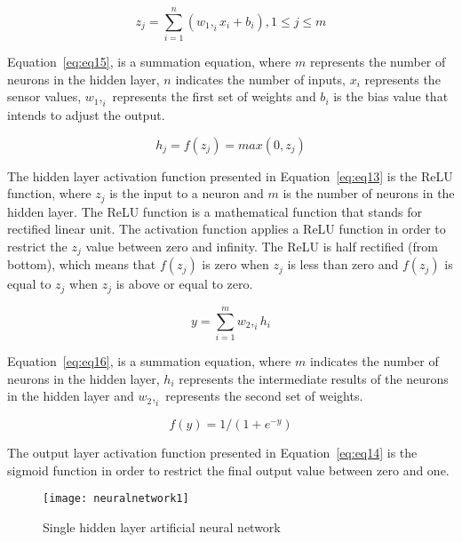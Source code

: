 \documentclass[runningheads]{llncs}
\begin{document}
\begin{equation}
\label{eq:eq15}
z_j = \sum_{i=1}^{n} (w_1,_ix_i + b_i),  1 \leq j \leq m
\end{equation}

Equation~\ref{eq:eq15}, is a summation equation, where $m$ represents the number of neurons in the hidden layer, $n$ indicates the number of inputs, $x_i$ represents the sensor values, $w_1,_i$ represents the first set of weights and $b_i$ is the bias value that intends to adjust the output.

\begin{equation}
\label{eq:eq13}
h_j = f(z_j) = max(0, z_j)
\end{equation}

The hidden layer activation function presented in Equation~\ref{eq:eq13} is the ReLU function, where $z_j$ is the input to a neuron and $m$ is the number of neurons in the hidden layer. The ReLU function is a mathematical function that stands for rectified linear unit. The activation function applies a ReLU function in order to restrict the $z_j$ value between zero and infinity. The ReLU is half rectified (from bottom), which means that $f(z_j)$ is zero when $z_j$ is less than zero and $f(z_j)$ is equal to $z_j$ when $z_j$ is above or equal to zero.

\begin{equation}
\label{eq:eq16}
y = \sum_{i=1}^{m} w_2,_ih_i
\end{equation}

Equation~\ref{eq:eq16}, is a summation equation, where $m$ indicates the number of neurons in the hidden layer, $h_i$ represents the intermediate results of the neurons in the hidden layer and $w_2,_i$ represents the second set of weights.

\begin{equation}
\label{eq:eq14}
f(y) = 1/(1 + e^{-y})
\end{equation}

The output layer activation function presented in Equation~\ref{eq:eq14} is the sigmoid function in order to restrict the final output value between zero and one.

\begin{figure}
\centering
\texttt{[image: neuralnetwork1]} 
\caption{Single hidden layer artificial neural network}
\label{fig:neuralnetwork}
\end{figure}
\end{document}
